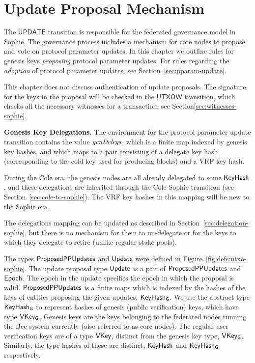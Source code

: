 \section{Update Proposal Mechanism}
\label{sec:update}


The $\mathsf{UPDATE}$ transition is responsible for the federated governance model in Sophie.
The governance process includes a mechanism for core nodes to propose and vote on
protocol parameter updates. In this chapter we
outline rules for genesis keys \textit{proposing} protocol parameter updates.
For rules regarding the \textit{adoption} of protocol
parameter updates, see Section~\ref{sec:pparam-update}.

This chapter does not discuss authentication of update proposals.
The signature for the keys in the proposal will be checked in the
$\mathsf{UTXOW}$ transition, which checks all the necessary witnesses
for a transaction, see Section\ref{sec:witnesses-sophie}.

\textbf{Genesis Key Delegations.} The environment for the protocol parameter
update transition contains the value $\mathit{genDelegs}$,
which is a finite map indexed by genesis key hashes,
and which maps to a pair consisting of a delegate key hash
(corresponding to the cold key used for producing blocks) and
a VRF key hash.

During the Cole era, the genesis nodes are all
already delegated to some $\mathsf{KeyHash}$, and these delegations are inherited
through the Cole-Sophie transition (see Section~\ref{sec:cole-to-sophie}).
The VRF key hashes in this mapping will be new to the Sophie era.

The delegations mapping can be updated as described in
Section~\ref{sec:delegation-sophie},
but there is no mechanism for them to un-delegate or for the keys to which they delegate
to retire (unlike regular stake pools).

The types $\mathsf{ProposedPPUpdates}$ and $\mathsf{Update}$ were defined in
Figure~\ref{fig:defs:utxo-sophie}.
The update proposal type $\mathsf{Update}$ is a pair of $\mathsf{ProposedPPUpdates}$ and $\mathsf{Epoch}$.
The epoch in the update specifies the epoch in which the proposal is valid.
$\mathsf{ProposedPPUpdates}$ is a finite maps which is indexed by the hashes of the keys of
entities proposing the given updates, $\mathsf{KeyHash_G}$.
We use the abstract type $\mathsf{KeyHash_G}$ to represent hashes of genesis
(public verification) keys, which have type $\mathsf{VKey_G}$.
Genesis keys are the keys belonging to the federated
nodes running the Bcc system currently (also referred to as core nodes).
The regular user verification keys are of a type $\mathsf{VKey}$, distinct from the
genesis key type, $\mathsf{VKey_G}$. Similarly, the type hashes of these
are distinct, $\mathsf{KeyHash}$ and $\mathsf{KeyHash_G}$ respectively.

